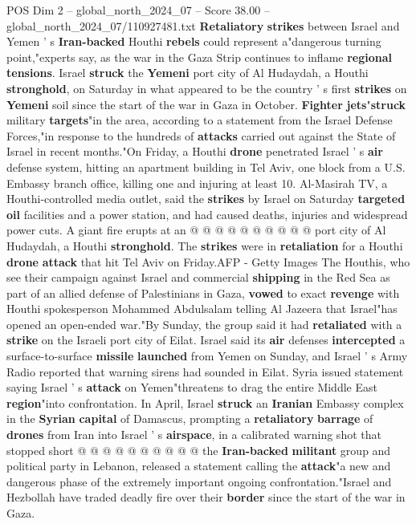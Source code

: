 \begin{textsample}{POS Dim 2 – global\_north\_2024\_07 – Score 38.00 – global\_north\_2024\_07/110927481.txt}  \label{ex:f2_pos_181}
\textbf{Retaliatory} \textbf{strikes} between Israel and Yemen ' s \textbf{Iran-backed} Houthi \textbf{rebels} could represent a"dangerous turning point,"experts say, as the war in the Gaza Strip continues to inflame \textbf{regional} \textbf{tensions}.
Israel \textbf{struck} the \textbf{Yemeni} port city of Al Hudaydah, a Houthi \textbf{stronghold}, on Saturday in what appeared to be the country ' s first \textbf{strikes} on \textbf{Yemeni} soil since the start of the war in Gaza in October. \textbf{Fighter} \textbf{jets}"\textbf{struck} military \textbf{targets}"in the area, according to a statement from the Israel Defense Forces,"in response to the hundreds of \textbf{attacks} carried out against the State of Israel in recent months."On Friday, a Houthi \textbf{drone} penetrated Israel ' s \textbf{air} defense system, hitting an apartment building in Tel Aviv, one block from a U.S.
Embassy branch office, killing one and injuring at least 10.
Al-Masirah TV, a Houthi-controlled media outlet, said the \textbf{strikes} by Israel on Saturday \textbf{targeted} \textbf{oil} facilities and a power station, and had caused deaths, injuries and widespread power cuts.
A giant fire erupts at an @ @ @ @ @ @ @ @ @ @ port city of Al Hudaydah, a Houthi \textbf{stronghold}.
The \textbf{strikes} were in \textbf{retaliation} for a Houthi \textbf{drone} \textbf{attack} that hit Tel Aviv on Friday.AFP - Getty Images The Houthis, who see their campaign against Israel and commercial \textbf{shipping} in the Red Sea as part of an allied defense of Palestinians in Gaza, \textbf{vowed} to exact \textbf{revenge} with Houthi spokesperson Mohammed Abdulsalam telling Al Jazeera that Israel"has opened an open-ended war."By Sunday, the group said it had \textbf{retaliated} with a \textbf{strike} on the Israeli port city of Eilat.
Israel said its \textbf{air} defenses \textbf{intercepted} a surface-to-surface \textbf{missile} \textbf{launched} from Yemen on Sunday, and Israel ' s Army Radio reported that warning sirens had sounded in Eilat.
Syria issued statement saying Israel ' s \textbf{attack} on Yemen"threatens to drag the entire Middle East \textbf{region}"into confrontation.
In April, Israel \textbf{struck} an \textbf{Iranian} Embassy complex in the \textbf{Syrian} \textbf{capital} of Damascus, prompting a \textbf{retaliatory} \textbf{barrage} of \textbf{drones} from Iran into Israel ' s \textbf{airspace}, in a calibrated warning shot that stopped short @ @ @ @ @ @ @ @ @ @ the \textbf{Iran-backed} \textbf{militant} group and political party in Lebanon, released a statement calling the \textbf{attack}"a new and dangerous phase of the extremely important ongoing confrontation."Israel and Hezbollah have traded deadly fire over their \textbf{border} since the start of the war in Gaza.

\end{textsample}
